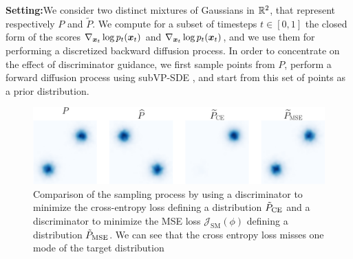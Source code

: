 \textbf{Setting:}We consider two distinct mixtures of Gaussians in $\mathbb{R}^{2}$, that represent respectively $P$ and $\tilde{P}$. We compute for a subset of timesteps $t \in [0,1]$ the closed form of the scores $\nabla_{\boldsymbol{x}_{t}} \log p_{t}(\boldsymbol{x}_{t})$ and $\nabla_{\boldsymbol{x}_{t}} \log p_{t}(\boldsymbol{x}_{t})$, and we use them for performing a discretized backward diffusion process. In order to concentrate on the effect of discriminator guidance, we first sample points from $P$, perform a forward diffusion process using subVP-SDE \citep{song2021scorebasedgenerativemodelingstochastic}, and start from this set of points as a prior distribution. 
\begin{figure}[b!]
    \centering
    \includegraphics[width=\textwidth]{gfx/3_scenarios_omega_1e4.pdf}
    \caption{Comparison of the sampling process by using a discriminator to minimize the cross-entropy loss defining a distribution $\Tilde{P}_{\mathrm{CE}}$ and a discriminator to minimize the MSE loss $\mathcal{J}_{\mathrm{SM}}(\phi)$ defining a distribution $\Tilde{P}_{\mathrm{MSE}}$. We can see that the cross entropy loss misses one mode of the target distribution}
    \label{fig:2Dplots}
\end{figure}

